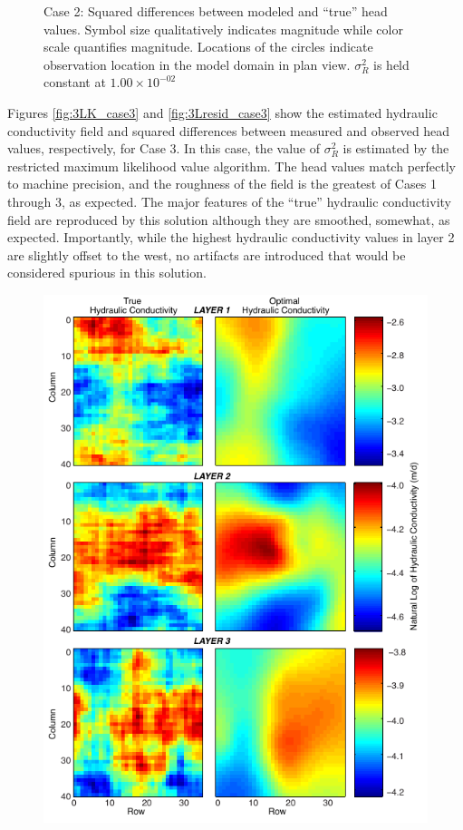 \documentclass[11pt,oneside,onecolumn]{usgsreport}
\begin{document}
\begin{appendix}
\begin{figure}[!t]
\caption{\label{fig:3Lresid_case2}Case 2: Squared differences between modeled
and ``true'' head values. Symbol size qualitatively indicates magnitude
while color scale quantifies magnitude. Locations of the circles indicate
observation location in the model domain in plan view. $\sigma_{R}^{2}$ is held constant at $1.00\times10^{-02}$}
\end{figure}


Figures \ref{fig:3LK_case3} and \ref{fig:3Lresid_case3} show the
estimated hydraulic conductivity field and squared differences between
measured and observed head values, respectively, for Case 3. In this
case, the value of $\sigma_{R}^{2}$ is estimated by the restricted
maximum likelihood value algorithm. The head values match perfectly
to machine precision, and the roughness of the field is the greatest
of Cases 1 through 3, as expected. The major features of the ``true''
hydraulic conductivity field are reproduced by this solution although
they are smoothed, somewhat, as expected. Importantly, while the highest
hydraulic conductivity values in layer 2 are slightly offset to the
west, no artifacts are introduced that would be considered spurious
in this solution.

\begin{figure}[!t]
\begin{center}\includegraphics{figures/3KL_case3}\end{center}


\end{figure}
\end{appendix}
\end{document}
